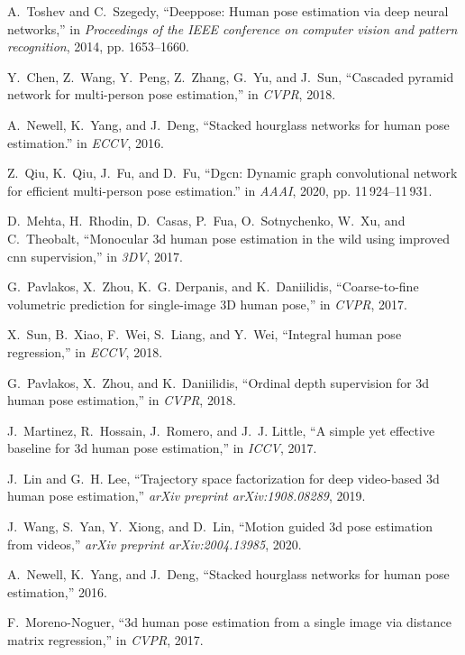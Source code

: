 \documentclass[journal]{IEEEtran}
\begin{document}
\begin{thebibliography}{10}
A.~Toshev and C.~Szegedy, ``Deeppose: Human pose estimation via deep neural
  networks,'' in \emph{Proceedings of the IEEE conference on computer vision
  and pattern recognition}, 2014, pp. 1653--1660.

Y.~Chen, Z.~Wang, Y.~Peng, Z.~Zhang, G.~Yu, and J.~Sun, ``Cascaded pyramid
  network for multi-person pose estimation,'' in \emph{CVPR}, 2018.

A.~Newell, K.~Yang, and J.~Deng, ``Stacked hourglass networks for human pose
  estimation.'' in \emph{ECCV}, 2016.

Z.~Qiu, K.~Qiu, J.~Fu, and D.~Fu, ``Dgcn: Dynamic graph convolutional network
  for efficient multi-person pose estimation.'' in \emph{AAAI}, 2020, pp.
  11\,924--11\,931.

D.~Mehta, H.~Rhodin, D.~Casas, P.~Fua, O.~Sotnychenko, W.~Xu, and C.~Theobalt,
  ``Monocular 3d human pose estimation in the wild using improved cnn
  supervision,'' in \emph{3DV}, 2017.

G.~Pavlakos, X.~Zhou, K.~G. Derpanis, and K.~Daniilidis, ``Coarse-to-fine
  volumetric prediction for single-image 3{D} human pose,'' in \emph{CVPR},
  2017.

X.~Sun, B.~Xiao, F.~Wei, S.~Liang, and Y.~Wei, ``Integral human pose
  regression,'' in \emph{ECCV}, 2018.

G.~Pavlakos, X.~Zhou, and K.~Daniilidis, ``Ordinal depth supervision for 3d
  human pose estimation,'' in \emph{CVPR}, 2018.

J.~Martinez, R.~Hossain, J.~Romero, and J.~J. Little, ``A simple yet effective
  baseline for 3d human pose estimation,'' in \emph{ICCV}, 2017.

J.~Lin and G.~H. Lee, ``Trajectory space factorization for deep video-based 3d
  human pose estimation,'' \emph{arXiv preprint arXiv:1908.08289}, 2019.

J.~Wang, S.~Yan, Y.~Xiong, and D.~Lin, ``Motion guided 3d pose estimation from
  videos,'' \emph{arXiv preprint arXiv:2004.13985}, 2020.

A.~Newell, K.~Yang, and J.~Deng, ``Stacked hourglass networks for human pose
  estimation,'' 2016.

F.~Moreno-Noguer, ``3d human pose estimation from a single image via distance
  matrix regression,'' in \emph{CVPR}, 2017.


\end{thebibliography}
\end{document}
